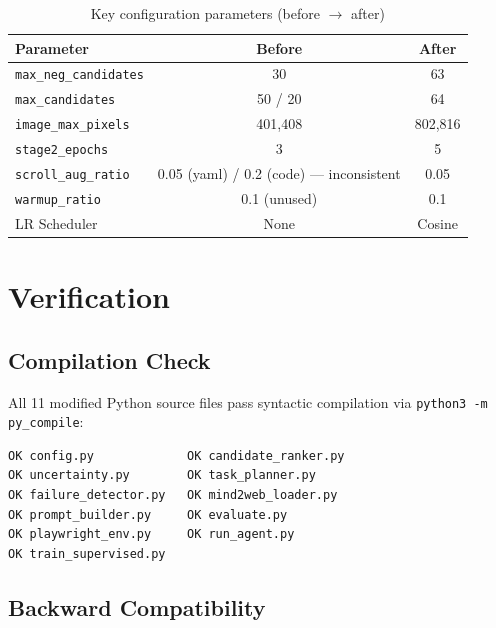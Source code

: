 \documentclass[11pt,a4paper]{article}
\begin{document}
\begin{table}[H]
\centering
\caption{Key configuration parameters (before $\rightarrow$ after)}
\begin{tabular}{lcc}
\toprule
\textbf{Parameter} & \textbf{Before} & \textbf{After} \\
\midrule
\texttt{max\_neg\_candidates}  & 30                                         & 63      \\
\texttt{max\_candidates}       & 50 / 20                                    & 64      \\
\texttt{image\_max\_pixels}    & 401,408                                    & 802,816 \\
\texttt{stage2\_epochs}        & 3                                          & 5       \\
\texttt{scroll\_aug\_ratio}    & 0.05 (yaml) / 0.2 (code) --- inconsistent & 0.05    \\
\texttt{warmup\_ratio}         & 0.1 (unused)                               & 0.1     \\
LR Scheduler                   & None                                       & Cosine  \\
\bottomrule
\end{tabular}
\end{table}


\section{Verification}

\subsection{Compilation Check}

All 11 modified Python source files pass syntactic compilation via
\texttt{python3 -m py\_compile}:

\begin{verbatim}
OK config.py             OK candidate_ranker.py
OK uncertainty.py        OK task_planner.py
OK failure_detector.py   OK mind2web_loader.py
OK prompt_builder.py     OK evaluate.py
OK playwright_env.py     OK run_agent.py
OK train_supervised.py
\end{verbatim}

\subsection{Backward Compatibility}
\end{document}
